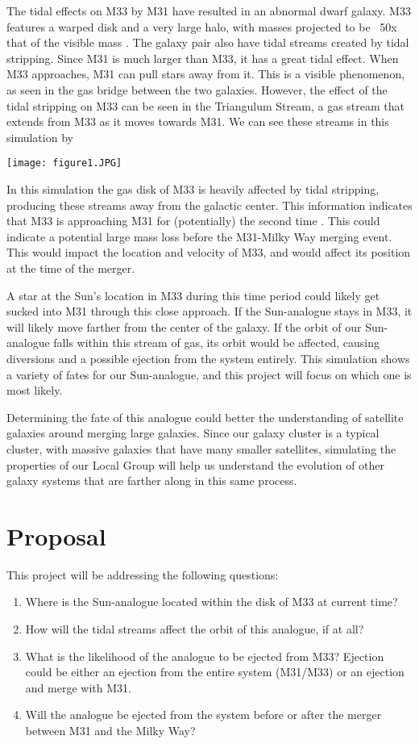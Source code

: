 \documentclass{aastex63}
\begin{document}
The tidal effects on M33 by M31 have resulted in an abnormal dwarf galaxy. M33 features a warped disk and a very large halo, with masses projected to be ~50x that of the visible mass \citep{Corbelli03}. The galaxy pair also have tidal streams created by tidal stripping. Since M31 is much larger than M33, it has a great tidal effect. When M33 approaches, M31 can pull stars away from it. This is a visible phenomenon, as seen in the gas bridge between the two galaxies. However, the effect of the tidal stripping on M33 can be seen in the Triangulum Stream, a gas stream that extends from M33 as it moves towards M31. We can see these streams in this simulation by \cite{TG2020}

\texttt{[image: figure1.JPG]}

In this simulation the gas disk of M33 is heavily affected by tidal stripping, producing these streams away from the galactic center. This information indicates that M33 is approaching M31 for (potentially) the second time \citep{TG2020}. This could indicate a potential large mass loss before the M31-Milky Way merging event. This would impact the location and velocity of M33, and would affect its position at the time of the merger. 

A star at the Sun's location in M33 during this time period could likely get sucked into M31 through this close approach. If the Sun-analogue stays in M33, it will likely move farther from the center of the galaxy. If the orbit of our Sun-analogue falls within this stream of gas, its orbit would be affected, causing diversions and a possible ejection from the system entirely. This simulation shows a variety of fates for our Sun-analogue, and this project will focus on which one is most likely.

Determining the fate of this analogue could better the understanding of satellite galaxies around merging large galaxies. Since our galaxy cluster is a typical cluster, with massive galaxies that have many smaller satellites, simulating the properties of our Local Group will help us understand the evolution of other galaxy systems that are farther along in this same process.

\section{Proposal}
This project will be addressing the following questions:

\begin{enumerate}
 \item Where is the Sun-analogue located within the disk of M33 at current time?
 \item How will the tidal streams affect the orbit of this analogue, if at all?
 \item What is the likelihood of the analogue to be ejected from M33? Ejection could be either an ejection from the entire system (M31/M33) or an ejection and merge with M31.
 \item Will the analogue be ejected from the system before or after the merger between M31 and the Milky Way?
\end{enumerate}
\end{document}
